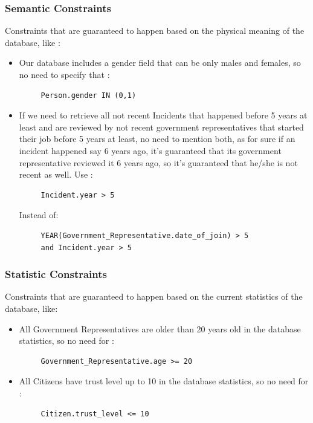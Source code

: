 \subsubsection{Semantic Constraints}
Constraints that are guaranteed to happen based on the physical meaning of the database, like :
\begin{itemize}
     \item Our database includes a gender field that can be only males and females, so no need to specify that :
     \begin{verbatim}
     Person.gender IN (0,1)
     \end{verbatim}
     \item If we need to retrieve all not recent Incidents that happened before 5 years at least and are reviewed by not recent government representatives that started their job before 5 years at least, no need to mention both, as for sure if an incident happened say 6 years ago, it's guaranteed that its government representative reviewed it 6 years ago, so it's guaranteed that he/she is not recent as well.
     Use :
     \begin{verbatim}
     Incident.year > 5
     \end{verbatim}
     Instead of:
     \begin{verbatim}
     YEAR(Government_Representative.date_of_join) > 5 
     and Incident.year > 5
     \end{verbatim}
\end{itemize}

\subsubsection{Statistic Constraints}
Constraints that are guaranteed to happen based on the current statistics of the database, like:
\begin{itemize}
     \item All Government Representatives are older than 20 years old in the database statistics, so no need for :
     \begin{verbatim}
     Government_Representative.age >= 20
     \end{verbatim}
     \item All Citizens have trust level up to 10 in the database statistics, so no need for :
     \begin{verbatim}
     Citizen.trust_level <= 10
     \end{verbatim}
\end{itemize}

